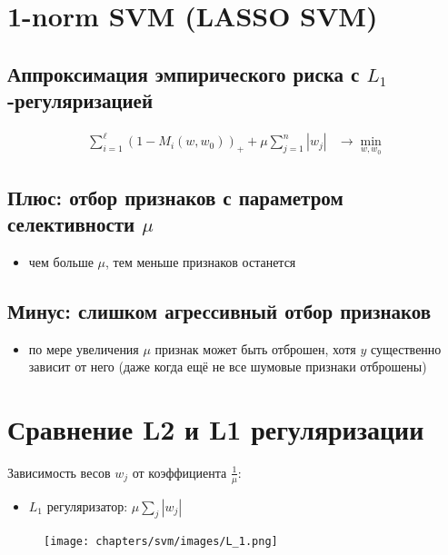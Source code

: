 \setcounter{secnumdepth}{0}

\section{1-norm SVM (LASSO SVM)}
\subsection*{Аппроксимация эмпирического риска с \(L_1\)-регуляризацией}
\begin{align*}
    \sum_{i=1}^{\ell} \left(1 - M_i(w, w_0)\right)_+ + \mu \sum_{j=1}^{n} |w_j| & \rightarrow \min_{w, w_0}
\end{align*}

\subsection*{Плюс: отбор признаков с параметром селективности \(\mu\)}
\begin{itemize}
    \item чем больше \(\mu\), тем меньше признаков останется
\end{itemize}

\subsection*{Минус: слишком агрессивный отбор признаков}
\begin{itemize}
    \item по мере увеличения \(\mu\) признак может быть отброшен, хотя $y$ существенно зависит от него (даже когда ещё не все шумовые признаки отброшены)
\end{itemize}

\vspace{10pt}

\section{Сравнение L2 и L1 регуляризации}

Зависимость весов \(w_j\) от коэффициента \(\frac{1}{\mu}\):

\begin{itemize}
    \item \(L_1\) регуляризатор: \(\mu \sum_{j} |w_j|\)
\end{itemize}

\begin{figure}[ht]
    \centering
    \texttt{[image: chapters/svm/images/L\_1.png]}
    \label{fig:image_1}    
\end{figure}

